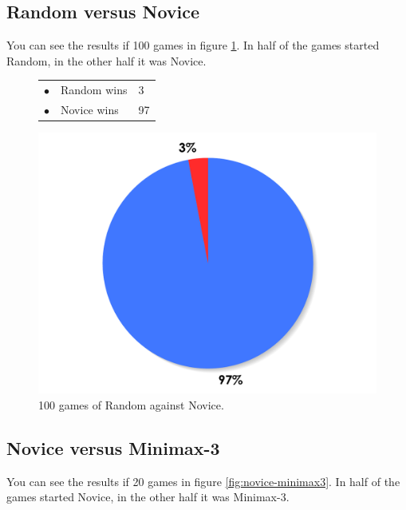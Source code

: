 \documentclass[paper=a4, fontsize=11pt]{article} %
\newcommand{\ra}[1]{\renewcommand{\arraystretch}{#1}}
\begin{document}
\subsection{Random versus Novice}
You can see the results if 100 games in figure \ref{fig:random-novice}. 
In half of the games started Random, in the other half it was Novice.



\begin{figure}[ht]
    \begin{minipage}[c]{0.40\linewidth}
        \centering
        \ra{1.3}
        \begin{tabular}{cll}
            \toprule
            \textcolor{red!100}{$\bullet$} & Random wins & 3       \\
            \textcolor{blue!100!yellow!100!red!80}{$\bullet$} & Novice wins & 97      \\  
            \bottomrule
        \end{tabular}
    \end{minipage}
    \begin{minipage}[c]{0.60\linewidth}
        \centering
        \includegraphics[scale=0.35]{img/random-novice.pdf}
    \end{minipage}
    \caption{100 games of Random against Novice.}
    \label{fig:random-novice}
\end{figure}



\subsection{Novice versus Minimax-3}
You can see the results if 20 games in figure \ref{fig:novice-minimax3}. 
In half of the games started Novice, in the other half it was Minimax-3.
\end{document}
